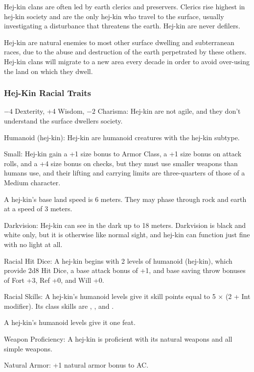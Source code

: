 Hej-kin clans are often led by earth clerics and preservers. Clerics rise highest in hej-kin society and are the only hej-kin who travel to the surface, usually investigating a disturbance that threatens the earth. Hej-kin are never defilers.

Hej-kin are natural enemies to most other surface dwelling and subterranean races, due to the abuse and destruction of the earth perpetrated by these others. Hej-kin clans will migrate to a new area every decade in order to avoid over-using the land on which they dwell.

\subsubsection{Hej-Kin Racial Traits}
\begin{itemize*}
    \item $-4$ Dexterity, +4 Wisdom, $-2$ Charisma: Hej-kin are not agile, and they don't understand the surface dwellers society.
    \item Humanoid (hej-kin): Hej-kin are humanoid creatures with the hej-kin subtype.
    \item Small: Hej-kin gain a +1 size bonus to Armor Class, a +1 size bonus on attack rolls, and a +4 size bonus on  checks, but they must use smaller weapons than humans use, and their lifting and carrying limits are three-quarters of those of a Medium character.
    \item A hej-kin's base land speed is 6 meters. They may phase through rock and earth at a speed of 3 meters.
    \item Darkvision: Hej-kin can see in the dark up to 18 meters. Darkvision is black and white only, but it is otherwise like normal sight, and hej-kin can function just fine with no light at all.
    \item Racial Hit Dice: A hej-kin begins with 2 levels of humanoid (hej-kin), which provide 2d8 Hit Dice, a base attack bonus of +1, and base saving throw bonuses of Fort +3, Ref +0, and Will +0.
    \item Racial Skills: A hej-kin's humanoid levels give it skill points equal to 5 $\times$ (2 + Int modifier). Its class skills are , ,  and .
    \item A hej-kin's humanoid levels give it one feat.
    \item Weapon Proficiency: A hej-kin is proficient with its natural weapons and all simple weapons.
    \item Natural Armor: +1 natural armor bonus to AC.

\end{itemize*}

